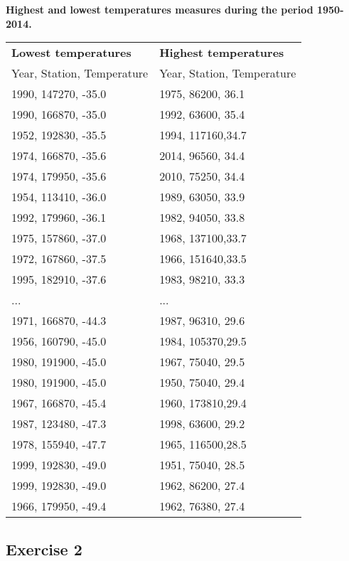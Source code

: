 \documentclass[a4paper,titlepage,12pt]{article}
\begin{document}
\textbf{Highest and lowest temperatures measures during the period 1950-2014.}
\begin{tabular}{l | l}
  \bf Lowest temperatures & \bf Highest temperatures \\ 
  Year, Station, Temperature & Year, Station, Temperature \\
  \hline
  1990, 147270, -35.0 & 1975, 86200, 36.1 \\ 
  1990, 166870, -35.0 & 1992, 63600, 35.4 \\ 
  1952, 192830, -35.5 & 1994, 117160,34.7 \\
  1974, 166870, -35.6 & 2014, 96560, 34.4 \\
  1974, 179950, -35.6 & 2010, 75250, 34.4 \\
  1954, 113410, -36.0 & 1989, 63050, 33.9 \\
  1992, 179960, -36.1 & 1982, 94050, 33.8 \\
  1975, 157860, -37.0 & 1968, 137100,33.7 \\
  1972, 167860, -37.5 & 1966, 151640,33.5 \\
  1995, 182910, -37.6 & 1983, 98210, 33.3 \\
  ... & ... \\
  1971, 166870, -44.3 & 1987, 96310, 29.6 \\
  1956, 160790, -45.0 & 1984, 105370,29.5 \\
  1980, 191900, -45.0 & 1967, 75040, 29.5 \\
  1980, 191900, -45.0 & 1950, 75040, 29.4 \\
  1967, 166870, -45.4 & 1960, 173810,29.4 \\
  1987, 123480, -47.3 & 1998, 63600, 29.2 \\
  1978, 155940, -47.7 & 1965, 116500,28.5 \\
  1999, 192830, -49.0 & 1951, 75040, 28.5 \\
  1999, 192830, -49.0 & 1962, 86200, 27.4 \\
  1966, 179950, -49.4 & 1962, 76380, 27.4 \\
\end{tabular}

\subsection{Exercise 2}
\end{document}
